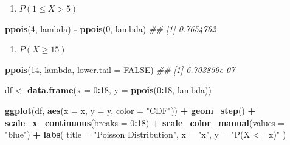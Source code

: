 \documentclass[
]{article}
\newenvironment{Shaded}{\begin{snugshade}}{\end{snugshade}}
\newcommand{\CommentTok}[1]{\textcolor[rgb]{0.56,0.35,0.01}{\textit{#1}}}
\newcommand{\DataTypeTok}[1]{\textcolor[rgb]{0.13,0.29,0.53}{#1}}
\newcommand{\DecValTok}[1]{\textcolor[rgb]{0.00,0.00,0.81}{#1}}
\newcommand{\KeywordTok}[1]{\textcolor[rgb]{0.13,0.29,0.53}{\textbf{#1}}}
\newcommand{\NormalTok}[1]{#1}
\newcommand{\OperatorTok}[1]{\textcolor[rgb]{0.81,0.36,0.00}{\textbf{#1}}}
\newcommand{\OtherTok}[1]{\textcolor[rgb]{0.56,0.35,0.01}{#1}}
\newcommand{\StringTok}[1]{\textcolor[rgb]{0.31,0.60,0.02}{#1}}
\providecommand{\tightlist}{%
  \setlength{\itemsep}{0pt}\setlength{\parskip}{0pt}}
\begin{document}
\begin{enumerate}
\def\labelenumi{\arabic{enumi}.}
\setcounter{enumi}{2}
\tightlist
\item
  \(P(1 \le X > 5)\)
\end{enumerate}

\begin{Shaded}
\begin{Highlighting}[]
\KeywordTok{ppois}\NormalTok{(}\DecValTok{4}\NormalTok{, lambda) }\OperatorTok{{-}}\StringTok{ }\KeywordTok{ppois}\NormalTok{(}\DecValTok{0}\NormalTok{, lambda)}
\CommentTok{\#\# [1] 0.7654762}
\end{Highlighting}
\end{Shaded}

\begin{enumerate}
\def\labelenumi{\arabic{enumi}.}
\setcounter{enumi}{3}
\tightlist
\item
  \(P(X \ge 15)\)
\end{enumerate}

\begin{Shaded}
\begin{Highlighting}[]
\KeywordTok{ppois}\NormalTok{(}\DecValTok{14}\NormalTok{, lambda, }\DataTypeTok{lower.tail =} \OtherTok{FALSE}\NormalTok{)}
\CommentTok{\#\# [1] 6.703859e{-}07}
\end{Highlighting}
\end{Shaded}

\begin{Shaded}
\begin{Highlighting}[]
\NormalTok{df \textless{}{-}}\StringTok{ }\KeywordTok{data.frame}\NormalTok{(}\DataTypeTok{x =} \DecValTok{0}\OperatorTok{:}\DecValTok{18}\NormalTok{, }\DataTypeTok{y =} \KeywordTok{ppois}\NormalTok{(}\DecValTok{0}\OperatorTok{:}\DecValTok{18}\NormalTok{, lambda))}

\KeywordTok{ggplot}\NormalTok{(df, }\KeywordTok{aes}\NormalTok{(}\DataTypeTok{x =}\NormalTok{ x, }\DataTypeTok{y =}\NormalTok{ y, }\DataTypeTok{color =} \StringTok{"CDF"}\NormalTok{)) }\OperatorTok{+}
\StringTok{  }\KeywordTok{geom\_step}\NormalTok{() }\OperatorTok{+}
\StringTok{  }\KeywordTok{scale\_x\_continuous}\NormalTok{(}\DataTypeTok{breaks =} \DecValTok{0}\OperatorTok{:}\DecValTok{18}\NormalTok{) }\OperatorTok{+}
\StringTok{  }\KeywordTok{scale\_color\_manual}\NormalTok{(}\DataTypeTok{values =} \StringTok{"blue"}\NormalTok{) }\OperatorTok{+}
\StringTok{  }\KeywordTok{labs}\NormalTok{(}
    \DataTypeTok{title =} \StringTok{"Poisson Distribution"}\NormalTok{,}
    \DataTypeTok{x =} \StringTok{"x"}\NormalTok{,}
    \DataTypeTok{y =} \StringTok{"P(X \textless{}= x)"}
\NormalTok{  )}
\end{Highlighting}
\end{Shaded}
\end{document}
